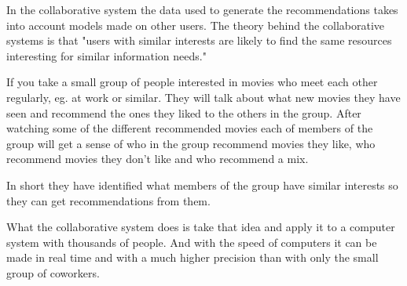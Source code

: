 In the collaborative system the data used to generate the recommendations takes into account models made on other users. The theory behind the collaborative systems is that "users with similar interests are likely to find the same resources interesting for similar information needs." \cite{TheAdaptiveWeb}

If you take a small group of people interested in movies who meet each other regularly, eg. at work or similar. They will talk about what new movies they have seen and recommend the ones they liked to the others in the group. After watching some of the different recommended movies each of members of the group will get a sense of who in the group recommend movies they like, who recommend movies they don't like and who recommend a mix.

In short they have identified what members of the group have similar interests so they can get recommendations from them.

What the collaborative system does is take that idea and apply it to a computer system with thousands of people. And with the speed of computers it can be made in real time and with a much higher precision than with only the small group of coworkers.
